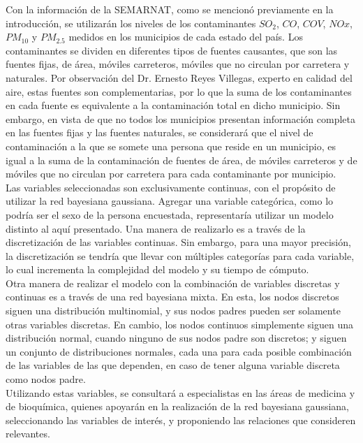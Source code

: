 \documentclass[12pt, letterpaper]{report}
\begin{document}
Con la información de la SEMARNAT, como se mencionó previamente en la introducción, se utilizarán los niveles de los contaminantes $SO_2$, $CO$, $COV$, $NOx$, $PM_{10}$ y $PM_{2.5}$ medidos en los municipios de cada estado del país. Los contaminantes se dividen en diferentes tipos de fuentes causantes, que son las fuentes fijas, de área, móviles carreteros, móviles que no circulan por carretera y naturales. Por observación del Dr. Ernesto Reyes Villegas, experto en calidad del aire, estas fuentes son complementarias, por lo que la suma de los contaminantes en cada fuente es equivalente a la contaminación total en dicho municipio. Sin embargo, en vista de que no todos los municipios presentan información completa en las fuentes fijas y las fuentes naturales, se considerará que el nivel de contaminación a la que se somete una persona que reside en un municipio, es igual a la suma de la contaminación de fuentes de área, de móviles carreteros y de móviles que no circulan por carretera para cada contaminante por municipio.
\\

Las variables seleccionadas son exclusivamente continuas, con el propósito de utilizar la red bayesiana gaussiana. Agregar una variable categórica, como lo podría ser el sexo de la persona encuestada, representaría utilizar un modelo distinto al aquí presentado. Una manera de realizarlo es a través de la discretización de las variables continuas. Sin embargo, para una mayor precisión, la discretización se tendría que llevar con múltiples categorías para cada variable, lo cual incrementa la complejidad del modelo y su tiempo de cómputo. \cite{cowell}
\\

Otra manera de realizar el modelo con la combinación de variables discretas y continuas es a través de una red bayesiana mixta. En esta, los nodos discretos siguen una distribución multinomial, y sus nodos padres pueden ser solamente otras variables discretas. En cambio, los nodos continuos simplemente siguen una distribución normal, cuando ninguno de sus nodos padre son discretos; y siguen un conjunto de distribuciones normales, cada una para cada posible combinación de las variables de las que dependen, en caso de tener alguna variable discreta como nodos padre. \cite{scutari2021bayesian}
\\

Utilizando estas variables, se consultará a especialistas en las áreas de medicina y de bioquímica, quienes apoyarán en la realización de la red bayesiana gaussiana, seleccionando las variables de interés, y proponiendo las relaciones que consideren relevantes.
\\
\end{document}

